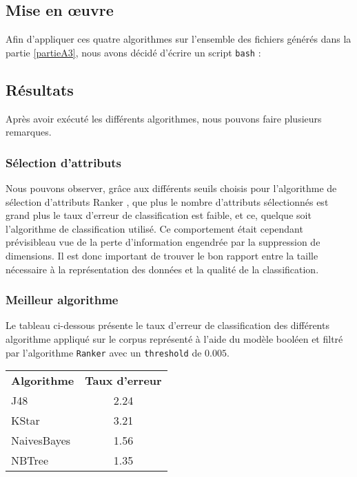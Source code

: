 \subsection{Mise en œuvre}
Afin d'appliquer ces quatre algorithmes sur l'ensemble des fichiers générés dans la partie \vref{partieA3}, nous avons décidé d'écrire un script \texttt{bash} :



\subsection{Résultats}

Après avoir exécuté les différents algorithmes, nous pouvons faire plusieurs remarques.

\subsubsection{Sélection d'attributs}
Nous pouvons observer, grâce aux différents seuils choisis pour l'algorithme de sélection d'attributs \og Ranker \fg{}, que plus le nombre d'attributs sélectionnés est grand plus le taux d'erreur de classification est faible, et ce, quelque soit l'algorithme de classification utilisé. Ce comportement était cependant prévisibleau vue de la perte d'information engendrée par la suppression de dimensions. Il est donc important de trouver le bon rapport entre la taille nécessaire à la représentation des données et la qualité de la classification.  

\subsubsection{Meilleur algorithme}

Le tableau ci-dessous présente le taux d'erreur de classification des différents algorithme appliqué sur le corpus représenté à l'aide du modèle booléen et filtré par l'algorithme \texttt{Ranker} avec un \texttt{threshold} de $0.005$.

\begin{tabular}{l c} 
\textbf{Algorithme} & \textbf{Taux d'erreur}\\
J48 & 2.24\\
KStar & 3.21\\
NaivesBayes & 1.56\\
NBTree & 1.35\\
\end{tabular}

